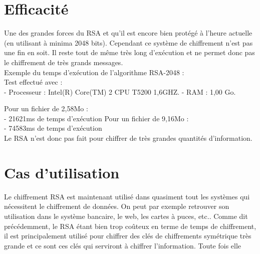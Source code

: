 	\section{Efficacité}
		Une des grandes forces du RSA et qu'il est encore bien protégé à l'heure actuelle (en utilisant à minima 2048 bits). Cependant ce système de chiffrement n'est pas une fin en soit. Il reste tout de même très long d'exécution et ne permet donc pas le chiffrement de très grands messages.\\
		
		Exemple du temps d'exécution de l'algorithme RSA-2048 :\\
			Test effectué avec :\\
			- Processeur : Intel(R) Core(TM) 2 CPU T5200 1,6GHZ.
			- RAM : 1,00 Go.
			
			Pour un fichier de 2,58Mo :\\
				- 21621ms de temps d'exécution 
			Pour un fichier de 9,16Mo :\\
				- 74583ms de temps d'exécution\\
				
		Le RSA n'est donc pas fait pour chiffrer de très grandes quantités d'information.
		
	\section{Cas d'utilisation}
		Le chiffrement RSA est maintenant utilisé dans quasiment tout les systèmes qui nécessitent le chiffrement de données. On peut par exemple retrouver son utilisation dans le système bancaire, le web, les cartes à puces, etc..
		Comme dit précédemment, le RSA étant bien trop coûteux en terme de temps de chiffrement, il est principalement utilisé pour chiffrer des clés de chiffrements symétrique très grande et ce sont ces clés qui serviront à chiffrer l'information. Toute fois elle